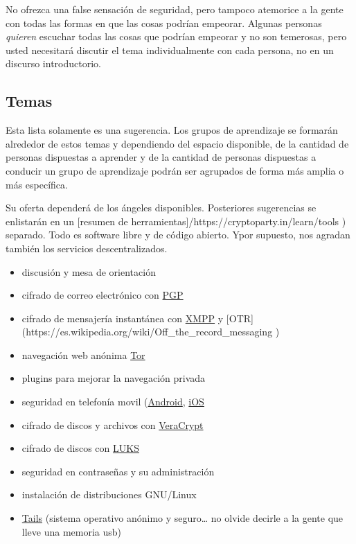 \documentclass[10pt,a5paper,twoside,,]{book}
\providecommand{\tightlist}{%
  \setlength{\itemsep}{0pt}\setlength{\parskip}{0pt}}
\begin{document}
No ofrezca una false sensación de seguridad, pero tampoco atemorice a la
gente con todas las formas en que las cosas podrían empeorar. Algunas
personas \emph{quieren} escuchar todas las cosas que podrían empeorar y
no son temerosas, pero usted necesitará discutir el tema individualmente
con cada persona, no en un discurso introductorio.

\subsection{Temas}\label{temas}

Esta lista solamente es una sugerencia. Los grupos de aprendizaje se
formarán alrededor de estos temas y dependiendo del espacio disponible,
de la cantidad de personas dispuestas a aprender y de la cantidad de
personas dispuestas a conducir un grupo de aprendizaje podrán ser
agrupados de forma más amplia o más específica.

Su oferta dependerá de los ángeles disponibles. Posteriores sugerencias
se enlistarán en un {[}resumen de
herramientas{]}/https://cryptoparty.in/learn/tools ) separado. Todo es
software libre y de código abierto. Ypor supuesto, nos agradan también
los servicios descentralizados.

\begin{itemize}
\tightlist
\item
  discusión y mesa de orientación
\item
  cifrado de correo electrónico con
  \href{https://es.wikipedia.org/wiki/PGP}{PGP}
\item
  cifrado de mensajería instantánea con
  \href{https://es.wikipedia.org/wiki/Extensible_Messaging_and_Presence_Protocol}{XMPP}
  y {[}OTR{]} (https://es.wikipedia.org/wiki/Off\_the\_record\_messaging
  )
\item
  navegación web anónima \href{https://torproject.org}{Tor}
\item
  plugins para mejorar la navegación privada
\item
  seguridad en telefonía movil
  (\href{https://cryptoparty.in/learn/tools\#android}{Android},
  \href{https://cryptoparty.in/learn/tools\#ios}{iOS}
\item
  cifrado de discos y archivos con
  \href{https://veracrypt.codeplex.com/}{VeraCrypt}
\item
  cifrado de discos con \href{https://es.wikipedia.org/wiki/LUKS}{LUKS}
\item
  seguridad en contraseñas y su administración
\item
  instalación de distribuciones GNU/Linux
\item
  \href{https://tails.boum.org/}{Tails} (sistema operativo anónimo y
  seguro\ldots{} no olvide decirle a la gente que lleve una memoria usb)
\end{itemize}
\end{document}
